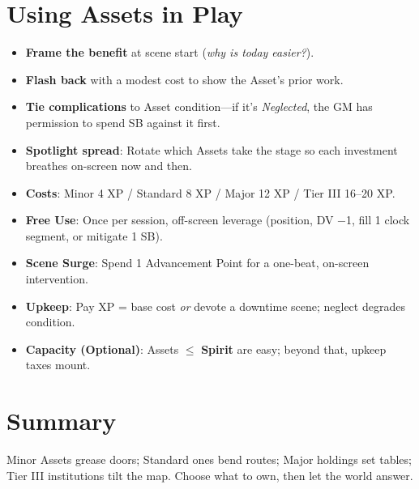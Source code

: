 \section{Using Assets in Play}
\begin{itemize}
  \item \textbf{Frame the benefit} at scene start (\emph{why is today easier?}).
  \item \textbf{Flash back} with a modest cost to show the Asset’s prior work.
  \item \textbf{Tie complications} to Asset condition—if it’s \emph{Neglected}, the GM has permission to spend SB against it first.
  \item \textbf{Spotlight spread}: Rotate which Assets take the stage so each investment breathes on-screen now and then.
\end{itemize}

\begin{tcolorbox}[colback=blue!5!white,colframe=blue!75!black,title=Asset Quick Reference,fonttitle=\bfseries]
\begin{itemize}
  \item \textbf{Costs}: Minor 4 XP / Standard 8 XP / Major 12 XP / Tier III 16–20 XP.
  \item \textbf{Free Use}: Once per session, off-screen leverage (position, DV −1, fill 1 clock segment, or mitigate 1 SB).
  \item \textbf{Scene Surge}: Spend 1 Advancement Point for a one-beat, on-screen intervention.
  \item \textbf{Upkeep}: Pay XP = base cost \emph{or} devote a downtime scene; neglect degrades condition.
  \item \textbf{Capacity (Optional)}: Assets $\leq$ \textbf{Spirit} are easy; beyond that, upkeep taxes mount.
\end{itemize}
\end{tcolorbox}

\section{Summary}
Minor Assets grease doors; Standard ones bend routes; Major holdings set tables; Tier III institutions tilt the map. Choose what to own, then let the world answer.

